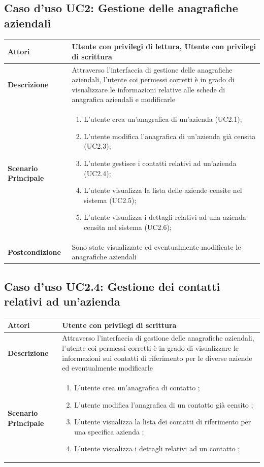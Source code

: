 \documentclass[12pt,a4paper,twoside,openright,english]{book}
\begin{document}
\begin{small}
	\subsection{Caso d'uso UC2: Gestione delle anagrafiche aziendali}
	\begin{longtable}{ | p{2.7cm} | p{12cm} |}
		\hline \textbf{Attori} & Utente con privilegi di lettura, Utente con privilegi di scrittura\\ 
		\hline \textbf{Descrizione} & Attraverso l’interfaccia di gestione delle anagrafiche aziendali, l’utente coi permessi corretti è in grado di visualizzare le informazioni relative alle schede di anagrafica aziendali e modificarle\\ 
		\hline \textbf{Scenario Principale} & \begin{enumerate}
			\item L’utente crea un’anagrafica di un’azienda  (UC2.1);
			\item L’utente modifica l’anagrafica di un’azienda già censita  (UC2.3);
			\item L’utente gestisce i contatti relativi ad un’azienda  (UC2.4);
			\item L’utente visualizza la lista delle aziende censite nel sistema  (UC2.5);
			\item L’utente visualizza i dettagli relativi ad una azienda censita nel sistema  (UC2.6);
			
		\end{enumerate}
		\\ 
		\hline \textbf{Postcondizione} & Sono state visualizzate ed eventualmente modificate le anagrafiche aziendali\\ 
		\hline 
	\end{longtable}
	
	\hypertarget{UC2.4}{}
	\subsection{Caso d'uso UC2.4: Gestione dei contatti relativi ad un'azienda}
	\begin{longtable}{ | p{2.7cm} | p{12cm} |}
		\hline \textbf{Attori} & Utente con privilegi di scrittura\\ 
		\hline \textbf{Descrizione} & Attraverso l’interfaccia di gestione delle anagrafiche aziendali, l’utente coi permessi corretti è in grado di visualizzare le informazioni sui contatti di riferimento per le diverse aziende ed eventualmente modificarle\\ 
		\hline \textbf{Scenario Principale} & \begin{enumerate}
			\item L’utente crea un’anagrafica di contatto ;
			\item L’utente modifica l’anagrafica di un contatto già censito ;
			\item L’utente visualizza la lista dei contatti di riferimento per una specifica azienda ;
			\item L’utente visualizza i dettagli relativi ad un contatto ;
			

\end{enumerate}
\end{longtable}
\end{small}
\end{document}
